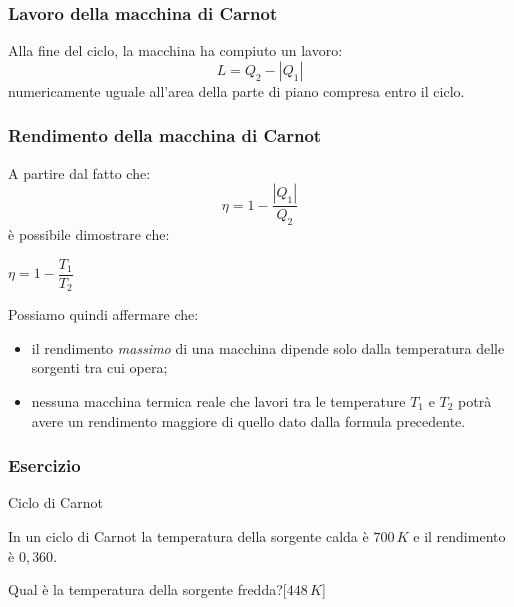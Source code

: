 \documentclass[]{beamer}
\theoremstyle{plain}
\begin{document}
\begin{frame}
  \frametitle{Lavoro della macchina di Carnot}
  Alla fine del ciclo, la macchina ha compiuto un lavoro:\[ L = Q_2 - |Q_1| \]numericamente uguale all'area della parte di piano compresa entro il ciclo.
\end{frame}

\begin{frame}
  \frametitle{Rendimento della macchina di Carnot}
  A partire dal fatto che:\[ \eta = 1 - \frac{|Q_1|}{Q_2} \]è possibile dimostrare che:
  \begin{center}
\colorbox{blue!30}{$ \eta = 1 - \dfrac{T_1}{T_2} $}
\end{center}\pause
Possiamo quindi affermare che:
\begin{itemize}
  \item il rendimento \emph{massimo} di una macchina dipende solo dalla temperatura delle sorgenti tra cui opera;\pause
  \item nessuna macchina termica reale che lavori tra le temperature $ T_1 $ e $ T_2 $ potrà avere un rendimento maggiore di quello dato dalla formula precedente.
\end{itemize}

  
\end{frame}

\begin{frame}
\frametitle{Esercizio}
\begin{exampleblock}{Ciclo di Carnot}
  \small{
  In un ciclo di Carnot la temperatura della sorgente calda è $ 700 \, K $ e il rendimento è $ 0,360 $.

  Qual è la temperatura della sorgente fredda?\hspace*{\fill}[$ 448 \, K $]}
\end{exampleblock}
\end{frame}
\end{document}
